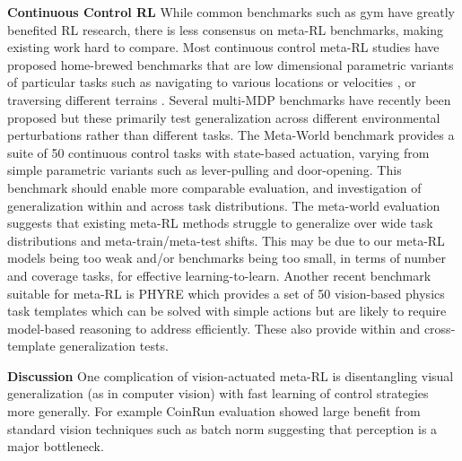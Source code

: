 \documentclass[10pt,journal,compsoc]{IEEEtran}
\newcommand{\cut}[1]{}
\newcommand{\keypoint}[1]{\vspace{0.1cm}\noindent\textbf{#1}\quad}
\begin{document}
\keypoint{Continuous Control RL} While common benchmarks such as gym \cite{gym} have greatly benefited RL research, there is less consensus on meta-RL benchmarks, making existing work hard to compare. Most continuous control meta-RL studies have proposed home-brewed benchmarks that are low dimensional parametric variants of particular tasks such as navigating to various locations or velocities \cite{finn2017maml,rakelly2019pearl}, or traversing different terrains \cite{clavera2019learning}. Several multi-MDP benchmarks \cite{packer2018assessing,zhao2019investigating} have recently been proposed but these primarily test generalization across different environmental perturbations rather than different tasks.
The Meta-World benchmark \cite{yu2019meta} provides a suite of 50 continuous control tasks with state-based actuation, varying from simple parametric variants such as lever-pulling and door-opening. This benchmark should enable more comparable evaluation, and investigation of generalization within and across task distributions. The meta-world evaluation \cite{yu2019meta} suggests that existing meta-RL methods struggle to generalize over wide task distributions and meta-train/meta-test shifts. This may be due to our meta-RL models being too weak and/or benchmarks being too small, in terms of number and coverage tasks, for effective learning-to-learn.
Another recent benchmark suitable for meta-RL is PHYRE \cite{bakhtin2019phyre} which provides a set of 50 vision-based physics task templates which can be solved with simple actions but are likely to require model-based reasoning to address efficiently. These \cut{are organised into 2 difficulty tiers, and } also provide within and cross-template generalization tests.



\keypoint{Discussion} One complication of vision-actuated meta-RL is disentangling visual generalization (as in computer vision) with fast learning of control strategies more generally. For example CoinRun \cite{cobbe2019quantifying} evaluation showed large benefit from standard vision techniques such as batch norm suggesting that perception is a major bottleneck.

\cut{A topical issue in meta-RL is that it is difficult to fit wide meta-train task distributions with multi-task or meta-learning models -- before even getting to the performance of meta-testing on novel tasks. This may be due to our RL models being too weak and/or benchmarks being too small in terms of number of tasks. Even Meta-World, ProcGen and PHYRE have dozens rather than hundreds of tasks like vision benchmarks such as tieredImageNet. While these latest benchmarks are improving, the field would still benefit from still larger benchmarks with controllable generalization gaps. It would also be beneficial to have benchmarks with greater difficulty such as requiring memory and abstract reasoning, to provide opportunities for more abstract strategies to be meta-learned and exploited across tasks.}
\end{document}
